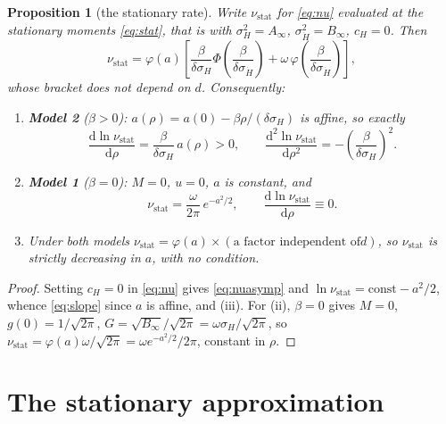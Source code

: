 \documentclass[11pt,a4paper]{article}
\newtheorem{proposition}{Proposition}
\theoremstyle{remark}\newtheorem{remark}[proposition]{Remark}
\newcommand{\dd}{\mathrm{d}}
\newcommand{\Ain}{A_{\infty}}
\newcommand{\Bin}{B_{\infty}}
\newcommand{\nustat}{\nu_{\mathrm{stat}}}
\begin{document}
\begin{proposition}[the stationary rate]\label{prop:statrate}
Write $\nustat$ for \eqref{eq:nu} evaluated at the stationary moments \eqref{eq:stat},
that is with $\sigma_H^{2}=\Ain$, $\sigma_{\dot H}^{2}=\Bin$, $c_H=0$. Then
\begin{equation}
\nustat=\varphi(a)\left[\frac{\beta}{\delta\sigma_H}\Phi\!\left(\frac{\beta}{\delta\sigma_{\dot H}}\right)
+\omega\,\varphi\!\left(\frac{\beta}{\delta\sigma_{\dot H}}\right)\right],
\label{eq:nuasymp}
\end{equation}
whose bracket does not depend on $d$. Consequently:
\begin{enumerate}
\item[(i)] \textbf{Model 2} ($\beta>0$): $a(\rho)=a(0)-\beta\rho/(\delta\sigma_H)$ is
affine, so exactly
\begin{equation}
\frac{\dd\ln\nustat}{\dd\rho}=\frac{\beta}{\delta\sigma_H}\,a(\rho)>0,
\qquad
\frac{\dd^{2}\ln\nustat}{\dd\rho^{2}}=-\left(\frac{\beta}{\delta\sigma_H}\right)^{\!2} .
\label{eq:slope}
\end{equation}
\item[(ii)] \textbf{Model 1} ($\beta=0$): $M=0$, $u=0$, $a$ is constant, and
\begin{equation}
\nustat=\frac{\omega}{2\pi}\,e^{-a^{2}/2},
\qquad
\frac{\dd\ln\nustat}{\dd\rho}\equiv0 .
\label{eq:m1flat}
\end{equation}
\item[(iii)] Under both models $\nustat=\varphi(a)\times(\text{a factor independent of
}d)$, so $\nustat$ is strictly decreasing in $a$, with no condition.
\end{enumerate}
\end{proposition}
\begin{proof}
Setting $c_H=0$ in \eqref{eq:nu} gives \eqref{eq:nuasymp} and
$\ln\nustat=\mathrm{const}-a^{2}/2$, whence \eqref{eq:slope} since $a$ is affine, and
(iii). For (ii), $\beta=0$ gives $M=0$, $g(0)=1/\sqrt{2\pi}$,
$G=\sqrt{\Bin}/\sqrt{2\pi}=\omega\sigma_H/\sqrt{2\pi}$, so
$\nustat=\varphi(a)\omega/\sqrt{2\pi}=\omega e^{-a^{2}/2}/2\pi$, constant in $\rho$.
\end{proof}

\section{The stationary approximation}\label{sec:approx}
\end{document}
